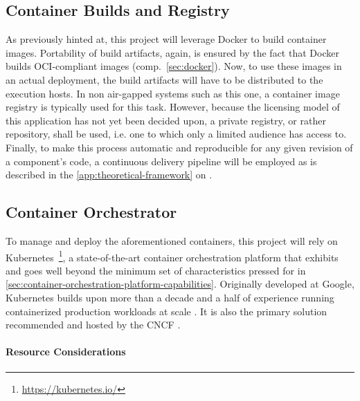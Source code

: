 \subsection{Container Builds and Registry}
\label{sec:deployment-container-builds-and-registry}

As previously hinted at, this project will leverage Docker to build container images. Portability of build artifacts, again, is ensured by the fact that Docker builds \acs{OCI}-compliant images (comp.~\autoref{sec:docker}). Now, to use these images in an actual deployment, the build artifacts will have to be distributed to the execution hosts. In non air-gapped systems such as this one, a container image registry is typically used for this task. However, because the licensing model of this application has not yet been decided upon, a private registry, or rather repository, shall be used, i.e. one to which only a limited audience has access to. Finally, to make this process automatic and reproducible for any given revision of a component's code, a continuous delivery pipeline will be employed as is described in the \autoref{app:theoretical-framework} on .


\subsection{Container Orchestrator}
\label{sec:deployment-container-orchestrator}

To manage and deploy the aforementioned containers, this project will rely on Kubernetes~\footnote{\url{https://kubernetes.io/}}, a state-of-the-art container orchestration platform that exhibits and goes well beyond the minimum set of characteristics pressed for in \autoref{sec:container-orchestration-platform-capabilities}. Originally developed at Google, Kubernetes builds upon more than a decade and a half of experience running containerized production workloads at scale \cite[p.~50]{burns2016borg}. It is also the primary solution recommended and hosted by the \ac{CNCF} \cite[p.~13]{pahl2017cloud}.


\paragraph{Resource Considerations}


